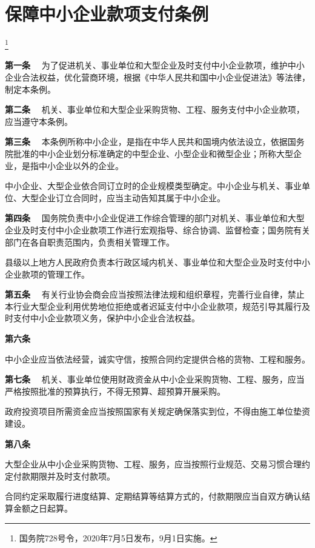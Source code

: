 \chapter{保障中小企业款项支付条例}\footnote{国务院728号令，2020年7月5日发布，9月1日实施。}

{ \bf 第一条 }　为了促进机关、事业单位和大型企业及时支付中小企业款项，维护中小企业合法权益，优化营商环境，根据《中华人民共和国中小企业促进法》等法律，制定本条例。

{ \bf 第二条 }　机关、事业单位和大型企业采购货物、工程、服务支付中小企业款项，应当遵守本条例。

{ \bf 第三条 }　本条例所称中小企业，是指在中华人民共和国境内依法设立，依据国务院批准的中小企业划分标准确定的中型企业、小型企业和微型企业；所称大型企业，是指中小企业以外的企业。

中小企业、大型企业依合同订立时的企业规模类型确定。中小企业与机关、事业单位、大型企业订立合同时，应当主动告知其属于中小企业。

{ \bf 第四条 }　国务院负责中小企业促进工作综合管理的部门对机关、事业单位和大型企业及时支付中小企业款项工作进行宏观指导、综合协调、监督检查；国务院有关部门在各自职责范围内，负责相关管理工作。

县级以上地方人民政府负责本行政区域内机关、事业单位和大型企业及时支付中小企业款项的管理工作。

{ \bf 第五条 }　有关行业协会商会应当按照法律法规和组织章程，完善行业自律，禁止本行业大型企业利用优势地位拒绝或者迟延支付中小企业款项，规范引导其履行及时支付中小企业款项义务，保护中小企业合法权益。

{ \bf 第六条 }　

中小企业应当依法经营，诚实守信，按照合同约定提供合格的货物、工程和服务。

{ \bf 第七条 }　机关、事业单位使用财政资金从中小企业采购货物、工程、服务，应当严格按照批准的预算执行，不得无预算、超预算开展采购。

政府投资项目所需资金应当按照国家有关规定确保落实到位，不得由施工单位垫资建设。

{ \bf 第八条 }　

大型企业从中小企业采购货物、工程、服务，应当按照行业规范、交易习惯合理约定付款期限并及时支付款项。

合同约定采取履行进度结算、定期结算等结算方式的，付款期限应当自双方确认结算金额之日起算。

